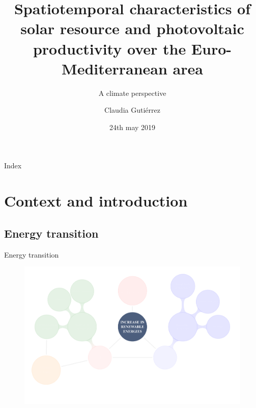 \documentclass{beamer}%
\title{Spatiotemporal characteristics of solar resource and photovoltaic productivity over the Euro-Mediterranean area}
\subtitle{A climate perspective}
\date{24th may 2019}
\author{Claudia Guti\'errez}
\institute[ICAM] %
 {
   \inst{1}
   Facultad de Ciencias Ambientales y Bioqu\'imica\\
   Universidad de Castilla-La Mancha, Toledo, Spain
}
\begin{document}
\maketitle

\begin{frame}[plain]{Index}                                                                                              \tableofcontents                                                                                                       %
\end{frame}

\section{Context and introduction}



\subsection{Energy transition}

\begin{frame}[fragile]{Energy transition}
\begin{figure}
\centering\includegraphics[scale=0.4]{diagram0.pdf}
\end{figure} 
\end{frame}
\end{document}
